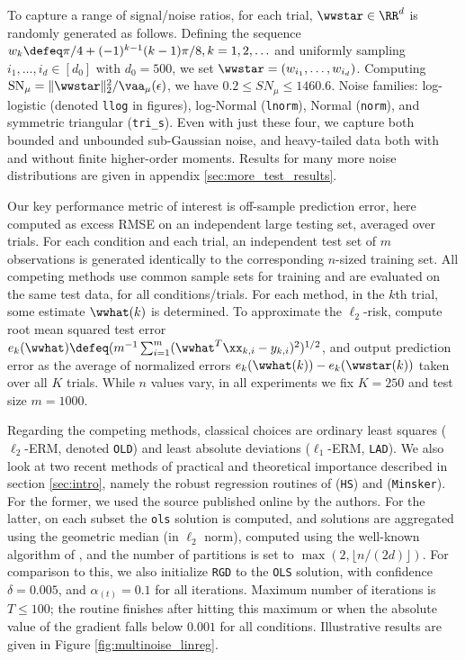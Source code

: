 \documentclass[11pt,oneside]{article}
\theoremstyle{definition} \newtheorem{defn}{Definition}       %
\theoremstyle{plain} \newtheorem{prop}[defn]{Proposition}           %
\theoremstyle{plain} \newtheorem{thm}[defn]{Theorem}                %
\theoremstyle{plain} \newtheorem{lem}[defn]{Lemma}                  %
\theoremstyle{plain} \newtheorem{cor}[defn]{Corollary}              %
\theoremstyle{remark} \newtheorem{rmk}[defn]{Remark}                %
\theoremstyle{remark} \newtheorem{ex}[defn]{Example}                %
\begin{document}
To capture a range of signal/noise ratios, for each trial, $\wwstar \in \RR^{d}$ is randomly generated as follows. Defining the sequence $w_{k} \defeq \pi/4 + (-1)^{k-1}(k-1)\pi/8, k=1,2,\ldots$ and uniformly sampling $i_{1},\ldots,i_{d} \in [d_{0}]$ with $d_{0}=500$, we set $\wwstar = (w_{i_{1}},\ldots,w_{i_{d}})$. Computing $\text{SN}_{\mu} = \|\wwstar\|_{2}^{2}/\vaa_{\mu}(\epsilon)$, we have $0.2 \leq SN_{\mu} \leq 1460.6$. Noise families: log-logistic (denoted \texttt{llog} in figures), log-Normal (\texttt{lnorm}), Normal (\texttt{norm}), and symmetric triangular (\texttt{tri\_s}). Even with just these four, we capture both bounded and unbounded sub-Gaussian noise, and heavy-tailed data both with and without finite higher-order moments. Results for many more noise distributions are given in appendix \ref{sec:more_test_results}.

Our key performance metric of interest is off-sample prediction error, here computed as excess RMSE on an independent large testing set, averaged over trials. For each condition and each trial, an independent test set of $m$ observations is generated identically to the corresponding $n$-sized training set. All competing methods use common sample sets for training and are evaluated on the same test data, for all conditions/trials. For each method, in the $k$th trial, some estimate $\wwhat(k)$ is determined. To approximate the $\ell_{2}$-risk, compute root mean squared test error $e_{k}(\wwhat) \defeq (m^{-1}\sum_{i=1}^{m}(\wwhat^{T}\xx_{k,i}-y_{k,i})^{2})^{1/2}$, and output prediction error as the average of normalized errors $e_{k}(\wwhat(k)) - e_{k}(\wwstar(k))$ taken over all $K$ trials. While $n$ values vary, in all experiments we fix $K=250$ and test size $m=1000$.

Regarding the competing methods, classical choices are ordinary least squares ($\ell_{2}$-ERM, denoted \texttt{OLD}) and least absolute deviations ($\ell_{1}$-ERM, \texttt{LAD}). We also look at two recent methods of practical and theoretical importance described in section \ref{sec:intro}, namely the robust regression routines of \citet{hsu2016a} (\texttt{HS}) and \citet{minsker2015a} (\texttt{Minsker}). For the former, we used the source published online by the authors. For the latter, on each subset the \texttt{ols} solution is computed, and solutions are aggregated using the geometric median (in $\ell_{2}$ norm), computed using the well-known algorithm of \citet[Eqn.~2.6]{vardi2000a}, and the number of partitions is set to $\max( 2, \lfloor n/(2d) \rfloor )$. For comparison to this, we also initialize \texttt{RGD} to the \texttt{OLS} solution, with confidence $\delta=0.005$, and $\alpha_{(t)} = 0.1$ for all iterations. Maximum number of iterations is $T \leq 100$; the routine finishes after hitting this maximum or when the absolute value of the gradient falls below $0.001$ for all conditions. Illustrative results are given in Figure \ref{fig:multinoise_linreg}.
\end{document}

